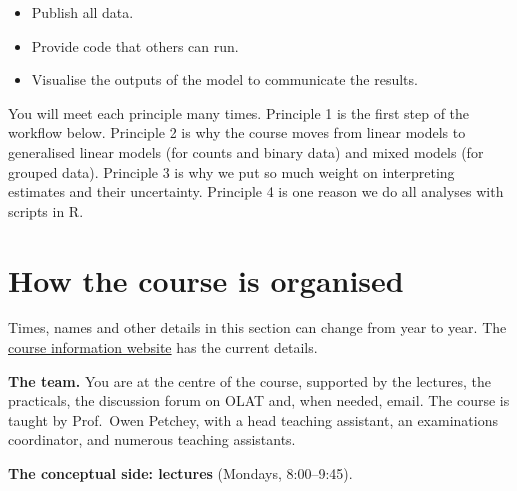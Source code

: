 \documentclass[
  letterpaper,
  8pt,
  a4paper]{book}
\providecommand{\tightlist}{%
  \setlength{\itemsep}{0pt}\setlength{\parskip}{0pt}}
\begin{document}
\begin{enumerate}
  \begin{itemize}
  \tightlist
  \item
    Publish all data.
  \item
    Provide code that others can run.
  \item
    Visualise the outputs of the model to communicate the results.
  \end{itemize}
\end{enumerate}

You will meet each principle many times. Principle 1 is the first step
of the workflow below. Principle 2 is why the course moves from linear
models to generalised linear models (for counts and binary data) and
mixed models (for grouped data). Principle 3 is why we put so much
weight on interpreting estimates and their uncertainty. Principle 4 is
one reason we do all analyses with scripts in R.

\section*{How the course is
organised}\label{how-the-course-is-organised}


\begin{tcolorbox}[enhanced jigsaw, arc=.35mm, bottomrule=.15mm, bottomtitle=1mm, breakable, colback=white, colbacktitle=quarto-callout-note-color!10!white, colframe=quarto-callout-note-color-frame, coltitle=black, left=2mm, leftrule=.75mm, opacityback=0, opacitybacktitle=0.6, rightrule=.15mm, title=\textcolor{quarto-callout-note-color}{\faInfo}\hspace{0.5em}{Note}, titlerule=0mm, toprule=.15mm, toptitle=1mm]

Times, names and other details in this section can change from year to
year. The
\href{https://opetchey.github.io/BIO144_Course_Information/}{course
information website} has the current details.

\end{tcolorbox}

\textbf{The team.} You are at the centre of the course, supported by the
lectures, the practicals, the discussion forum on OLAT and, when needed,
email. The course is taught by Prof.~Owen Petchey, with a head teaching
assistant, an examinations coordinator, and numerous teaching
assistants.

\textbf{The conceptual side: lectures} (Mondays, 8:00--9:45).
\end{document}
